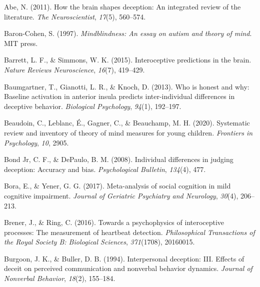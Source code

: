 \documentclass[
  man,mask,floatsintext]{apa6}
\newlength{\cslhangindent}
\newlength{\cslentryspacingunit} %
\newenvironment{CSLReferences}[2] %
 {%
  \setlength{\parindent}{0pt}
  \ifodd #1
  \let\oldpar\par
  \def\par{\hangindent=\cslhangindent\oldpar}
  \fi
  \setlength{\parskip}{#2\cslentryspacingunit}
 }%
 {}
\begin{document}
\hypertarget{refs}{}
\begin{CSLReferences}{1}{0}
\leavevmode{}%
Abe, N. (2011). How the brain shapes deception: An integrated review of the literature. \emph{The Neuroscientist}, \emph{17}(5), 560--574.

\leavevmode{}%
Baron-Cohen, S. (1997). \emph{Mindblindness: An essay on autism and theory of mind}. MIT press.

\leavevmode{}%
Barrett, L. F., \& Simmons, W. K. (2015). Interoceptive predictions in the brain. \emph{Nature Reviews Neuroscience}, \emph{16}(7), 419--429.

\leavevmode{}%
Baumgartner, T., Gianotti, L. R., \& Knoch, D. (2013). Who is honest and why: Baseline activation in anterior insula predicts inter-individual differences in deceptive behavior. \emph{Biological Psychology}, \emph{94}(1), 192--197.

\leavevmode{}%
Beaudoin, C., Leblanc, É., Gagner, C., \& Beauchamp, M. H. (2020). Systematic review and inventory of theory of mind measures for young children. \emph{Frontiers in Psychology}, \emph{10}, 2905.

\leavevmode{}%
Bond Jr, C. F., \& DePaulo, B. M. (2008). Individual differences in judging deception: Accuracy and bias. \emph{Psychological Bulletin}, \emph{134}(4), 477.

\leavevmode{}%
Bora, E., \& Yener, G. G. (2017). Meta-analysis of social cognition in mild cognitive impairment. \emph{Journal of Geriatric Psychiatry and Neurology}, \emph{30}(4), 206--213.

\leavevmode{}%
Brener, J., \& Ring, C. (2016). Towards a psychophysics of interoceptive processes: The measurement of heartbeat detection. \emph{Philosophical Transactions of the Royal Society B: Biological Sciences}, \emph{371}(1708), 20160015.

\leavevmode{}%
Burgoon, J. K., \& Buller, D. B. (1994). Interpersonal deception: III. Effects of deceit on perceived communication and nonverbal behavior dynamics. \emph{Journal of Nonverbal Behavior}, \emph{18}(2), 155--184.


\end{CSLReferences}
\end{document}
